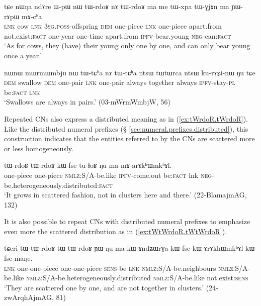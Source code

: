 \begin{exe}
\ex \label{ex:tWrdoʁ.nA.tWrdoʁ}
 \gll  tɕe nɯŋa ndɤre ɯ-pɯ nɯ tɯ-rdoʁ nɤ tɯ-rdoʁ ma me tɯ-xpa tɯ-ɣjɤn ma ɲɯ-rɤpɯ mɤ-cʰa \\
 \textsc{lnk} cow \textsc{lnk} \textsc{3sg}.\textsc{poss}-offspring \textsc{dem} one-piece \textsc{lnk} one-piece apart.from not.exist:\textsc{fact}  one-year one-time apart.from \textsc{ipfv}-bear.young \textsc{neg}-can:\textsc{fact} \\
 \glt `As for cows, they (have) their young only one by one, and can only bear young once a year.'
\end{exe}

\begin{exe}
\ex \label{ex:tWCha.nA.tWCha}
 \gll nɯnɯ mɯrmɯmbju nɯ tɯ-tɕʰa nɤ tɯ-tɕʰa ntsɯ tɯtɯrca ntsɯ ku-rɤʑi-nɯ ŋu tɕe \\
 \textsc{dem} swallow \textsc{dem} one-pair \textsc{lnk}  one-pair  always together always \textsc{ipfv}-stay-\textsc{pl} be:\textsc{fact} \textsc{lnk}  \\
 \glt `Swallows are always in pairs.' (03-mWrmWmbjW, 56)
\end{exe}

Repeated CNs also express a distributed meaning as in (\ref{ex:tWrdoR.tWrdoR}). Like the distributed numeral prefixes (§ \ref{sec:numeral.prefixes.distributed}), this construction indicates that the entities referred to by the CNs are scattered more or less homogeneously.

\begin{exe}
\ex \label{ex:tWrdoR.tWrdoR}
 \gll  tɯ-rdoʁ tɯ-rdoʁ kɯ-fse tu-ɬoʁ ŋu ma mɤ-arɤkʰɯmkʰɤl. \\
 one-piece one-piece \textsc{nmlz}:S/A-be.like \textsc{ipfv}-come.out  be:\textsc{fact} lnk \textsc{neg}-be.heterogeneously.distributed:\textsc{fact} \\
 \glt `It grows in scattered fashion, not in clusters here and there.' (22-BlamajmAG, 132)
\end{exe}

It is also possible to repeat CNs with distributed numeral prefixes to emphasize even more the scattered distribution as in (\ref{ex:tWtWrdoR.tWtWrdoR}).

\begin{exe}
\ex \label{ex:tWtWrdoR.tWtWrdoR}
 \gll 
tɕeri tɯ-tɯ-rdoʁ tɯ-tɯ-rdoʁ ɲɯ-ŋu ma kɯ-ɤndʑɯrɣa kɯ-fse kɯ-ɤrɤkhɯmkʰɤl kɯ-fse maŋe.  \\
\textsc{lnk} one-one-piece one-one-piece \textsc{sens}-be \textsc{lnk}  \textsc{nmlz}:S/A-be.neighbours \textsc{nmlz}:S/A-be.like \textsc{nmlz}:S/A-be.heterogeneously.distributed \textsc{nmlz}:S/A-be.like not.exist:\textsc{sens} \\
\glt  `They are scattered one by one, and are not together in clusters.' (24-zwArqhAjmAG, 81)
\end{exe}

